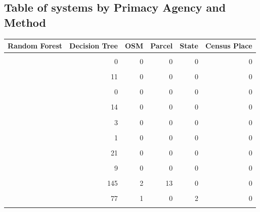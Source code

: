 \documentclass[12pt]{article}
\begin{document}
\subsection{Table of systems by Primacy Agency and
Method}\label{table-of-systems-by-primacy-agency-and-method}

\begin{longtable*}{rrrrrr}
\toprule
Random Forest & Decision Tree & OSM & Parcel & State & Census Place \\ 
\midrule\addlinespace[2.5pt]
 \\ 
\midrule{} & 0 & 0 & 0 & 0 & 0 \\ 
\midrule\addlinespace[2.5pt]
 \\ 
\midrule{} & 11 & 0 & 0 & 0 & 0 \\ 
\midrule\addlinespace[2.5pt]
 \\ 
\midrule{} & 0 & 0 & 0 & 0 & 0 \\ 
\midrule\addlinespace[2.5pt]
 \\ 
\midrule{} & 14 & 0 & 0 & 0 & 0 \\ 
\midrule\addlinespace[2.5pt]
 \\ 
\midrule{} & 3 & 0 & 0 & 0 & 0 \\ 
\midrule\addlinespace[2.5pt]
 \\ 
\midrule{} & 1 & 0 & 0 & 0 & 0 \\ 
\midrule\addlinespace[2.5pt]
 \\ 
\midrule{} & 21 & 0 & 0 & 0 & 0 \\ 
\midrule\addlinespace[2.5pt]
 \\ 
\midrule{} & 9 & 0 & 0 & 0 & 0 \\ 
\midrule\addlinespace[2.5pt]
 \\ 
\midrule{} & 145 & 2 & 13 & 0 & 0 \\ 
\midrule\addlinespace[2.5pt]
 \\ 
\midrule{} & 77 & 1 & 0 & 2 & 0 \\ 
\midrule\addlinespace[2.5pt]
 \\ 

\end{longtable*}
\end{document}
